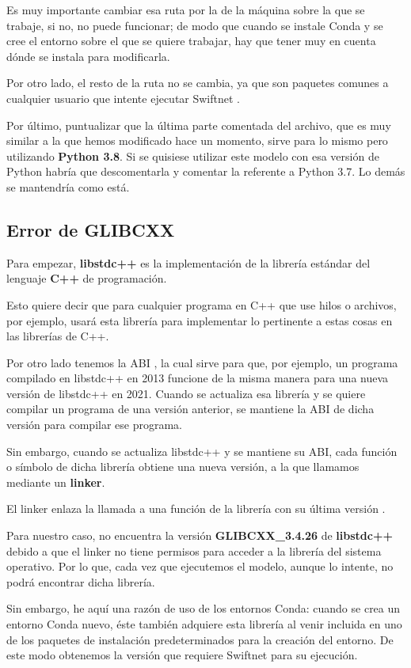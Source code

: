 Es muy importante cambiar esa ruta por la de la máquina sobre la que se trabaje, si no, no puede funcionar; de modo que cuando se instale Conda y se cree el entorno sobre el que se quiere trabajar, hay que tener muy en cuenta dónde se instala para modificarla.

Por otro lado, el resto de la ruta no se cambia, ya que son paquetes comunes a cualquier usuario que intente ejecutar Swiftnet \cite{swiftnet}.

Por último, puntualizar que la última parte comentada del archivo, que es muy similar a la que hemos modificado hace un momento, sirve para lo mismo pero utilizando \textbf{Python 3.8}. Si se quisiese utilizar este modelo con esa versión de Python habría que descomentarla y comentar la referente a Python 3.7. Lo demás se mantendría como está.

\subsection{Error de GLIBCXX}

Para empezar, \textbf{libstdc++} \cite{glibcxx} es la implementación de la librería estándar del lenguaje \textbf{C++} de programación.

Esto quiere decir que para cualquier programa en C++ que use hilos o archivos, por ejemplo, usará esta librería para implementar lo pertinente a estas cosas en las librerías de C++.

Por otro lado tenemos la \ac{ABI} \cite{glibcxx}, la cual sirve para que, por ejemplo, un programa compilado en libstdc++ en 2013 funcione de la misma manera para una nueva versión de libstdc++ en 2021. Cuando se actualiza esa librería y se quiere compilar un programa de una versión anterior, se mantiene la ABI de dicha versión para compilar ese programa.

Sin embargo, cuando se actualiza libstdc++ y se mantiene su ABI, cada función o símbolo de dicha librería obtiene una nueva versión, a la que llamamos mediante un \textbf{linker}.

El linker enlaza la llamada a una función de la librería con su última versión \cite{glibcxx}.

Para nuestro caso, no encuentra la versión \textbf{GLIBCXX\_3.4.26} de \textbf{libstdc++} debido a que el linker no tiene permisos para acceder a la librería del sistema operativo. Por lo que, cada vez que ejecutemos el modelo, aunque lo intente, no podrá encontrar dicha librería.

Sin embargo, he aquí una razón de uso de los entornos Conda: cuando se crea un entorno Conda nuevo, éste también adquiere esta librería al venir incluida en uno de los paquetes de instalación predeterminados para la creación del entorno. De este modo obtenemos la versión que requiere Swiftnet para su ejecución.

